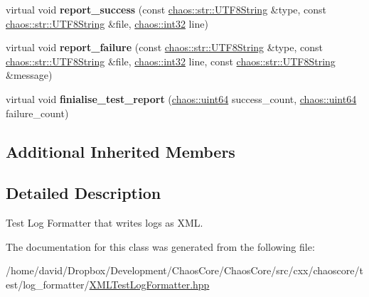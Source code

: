 \begin{DoxyCompactItemize}
\item 
\hypertarget{classchaos_1_1test_1_1log__formatter_1_1_x_m_l_test_log_formatter_a31fba9826f0283816e7ae49be8518e8b}{virtual void {\bfseries report\-\_\-success} (const \hyperlink{classchaos_1_1str_1_1_u_t_f8_string}{chaos\-::str\-::\-U\-T\-F8\-String} \&type, const \hyperlink{classchaos_1_1str_1_1_u_t_f8_string}{chaos\-::str\-::\-U\-T\-F8\-String} \&file, \hyperlink{namespacechaos_ad1de7efb430365afd2c9446a0f522a90}{chaos\-::int32} line)}\label{classchaos_1_1test_1_1log__formatter_1_1_x_m_l_test_log_formatter_a31fba9826f0283816e7ae49be8518e8b}

\item 
\hypertarget{classchaos_1_1test_1_1log__formatter_1_1_x_m_l_test_log_formatter_ad27b65b89d70c313603ba305cab8f90e}{virtual void {\bfseries report\-\_\-failure} (const \hyperlink{classchaos_1_1str_1_1_u_t_f8_string}{chaos\-::str\-::\-U\-T\-F8\-String} \&type, const \hyperlink{classchaos_1_1str_1_1_u_t_f8_string}{chaos\-::str\-::\-U\-T\-F8\-String} \&file, \hyperlink{namespacechaos_ad1de7efb430365afd2c9446a0f522a90}{chaos\-::int32} line, const \hyperlink{classchaos_1_1str_1_1_u_t_f8_string}{chaos\-::str\-::\-U\-T\-F8\-String} \&message)}\label{classchaos_1_1test_1_1log__formatter_1_1_x_m_l_test_log_formatter_ad27b65b89d70c313603ba305cab8f90e}

\item 
\hypertarget{classchaos_1_1test_1_1log__formatter_1_1_x_m_l_test_log_formatter_a35b3dd24ed833d7ae0c796492ef6e0fe}{virtual void {\bfseries finialise\-\_\-test\-\_\-report} (\hyperlink{namespacechaos_a34fe5f5bfc3ef6d80b5d094ed91b4d6e}{chaos\-::uint64} success\-\_\-count, \hyperlink{namespacechaos_a34fe5f5bfc3ef6d80b5d094ed91b4d6e}{chaos\-::uint64} failure\-\_\-count)}\label{classchaos_1_1test_1_1log__formatter_1_1_x_m_l_test_log_formatter_a35b3dd24ed833d7ae0c796492ef6e0fe}

\end{DoxyCompactItemize}
\subsection*{Additional Inherited Members}


\subsection{Detailed Description}
Test Log Formatter that writes logs as X\-M\-L. 

The documentation for this class was generated from the following file\-:\begin{DoxyCompactItemize}
\item 
/home/david/\-Dropbox/\-Development/\-Chaos\-Core/\-Chaos\-Core/src/cxx/chaoscore/test/log\-\_\-formatter/\hyperlink{_x_m_l_test_log_formatter_8hpp}{X\-M\-L\-Test\-Log\-Formatter.\-hpp}\end{DoxyCompactItemize}
